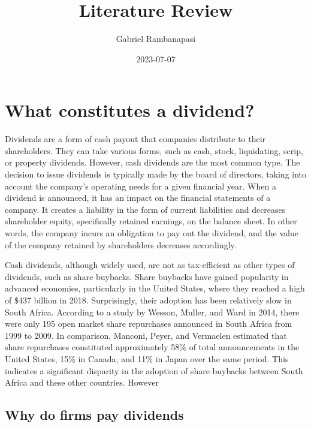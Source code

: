 \documentclass[
]{article}
\title{Literature Review}
\author{Gabriel Rambanapasi}
\date{2023-07-07}
\begin{document}
\maketitle

\hypertarget{what-constitutes-a-dividend}{%
\section{What constitutes a
dividend?}\label{what-constitutes-a-dividend}}

Dividends are a form of cash payout that companies distribute to their
shareholders. They can take various forms, such as cash, stock,
liquidating, scrip, or property dividends. However, cash dividends are
the most common type. The decision to issue dividends is typically made
by the board of directors, taking into account the company's operating
needs for a given financial year. When a dividend is announced, it has
an impact on the financial statements of a company. It creates a
liability in the form of current liabilities and decreases shareholder
equity, specifically retained earnings, on the balance sheet. In other
words, the company incurs an obligation to pay out the dividend, and the
value of the company retained by shareholders decreases accordingly.

Cash dividends, although widely used, are not as tax-efficient as other
types of dividends, such as share buybacks. Share buybacks have gained
popularity in advanced economies, particularly in the United States,
where they reached a high of \$437 billion in 2018. Surprisingly, their
adoption has been relatively slow in South Africa. According to a study
by Wesson, Muller, and Ward in 2014, there were only 195 open market
share repurchases announced in South Africa from 1999 to 2009. In
comparison, Manconi, Peyer, and Vermaelen estimated that share
repurchases constituted approximately 58\% of total announcements in the
United States, 15\% in Canada, and 11\% in Japan over the same period.
This indicates a significant disparity in the adoption of share buybacks
between South Africa and these other countries. However

\hypertarget{why-do-firms-pay-dividends}{%
\subsection{Why do firms pay
dividends}\label{why-do-firms-pay-dividends}}
\end{document}

